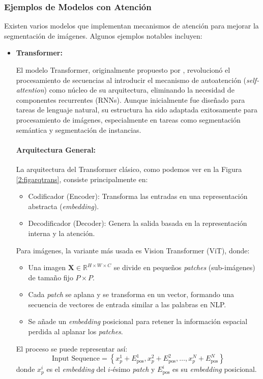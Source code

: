 \subsubsection{Ejemplos de Modelos con Atención}  
Existen varios modelos que implementan mecanismos de atención para mejorar la segmentación de imágenes. Algunos ejemplos notables incluyen:
\begin{itemize}
    \item \textbf{Transformer:} 
    
	El modelo Transformer, originalmente propuesto por \cite{autor2022transformer}, revolucionó el procesamiento de secuencias al introducir el mecanismo de autoatención (\textit{self-attention}) como núcleo de su arquitectura, eliminando la necesidad de componentes recurrentes (RNNs). Aunque inicialmente fue diseñado para tareas de lenguaje natural, su estructura ha sido adaptada exitosamente para procesamiento de imágenes, especialmente en tareas como segmentación semántica y segmentación de instancias.

\paragraph{Arquitectura General:}

La arquitectura del Transformer clásico, como podemos ver en la Figura \ref{2:figarqtrans}, consiste principalmente en:
\begin{itemize}[label=$\bullet$, leftmargin=1em]
    \item Codificador (Encoder): Transforma las entradas en una representación abstracta (\textit{embedding}). \parencite{autor2022transformer}
    \item Decodificador (Decoder): Genera la salida basada en la representación interna y la atención. \parencite{autor2022transformer}
\end{itemize}
Para imágenes, la variante más usada es Vision Transformer (ViT), donde:
\begin{itemize}[label=$\bullet$, leftmargin=1em]
    \item Una imagen $\mathbf{X} \in \mathbb{R}^{H \times W \times C}$ se divide en pequeños \textit{patches} (sub-imágenes) de tamaño fijo $P \times P$. \parencite{autor2022transformer}
    \item Cada \textit{patch} se aplana y se transforma en un vector, formando una secuencia de vectores de entrada similar a las palabras en NLP. \parencite{autor2022transformer}
    \item Se añade un \textit{embedding} posicional para retener la información espacial perdida al aplanar los \textit{patches}. \parencite{autor2022transformer}
\end{itemize}
El proceso se puede representar así:
\begin{equation}\label{eq:input_sequence_transformer}
    \text{Input Sequence} = \left\{ x_p^1 + E_{\text{pos}}^1, x_p^2 + E_{\text{pos}}^2, \ldots, x_p^N + E_{\text{pos}}^N \right\}
\end{equation}
donde $x_p^i$ es el \textit{embedding} del $i$-ésimo \textit{patch} y $E_{\text{pos}}^i$ es su \textit{embedding} posicional.



\end{itemize}
